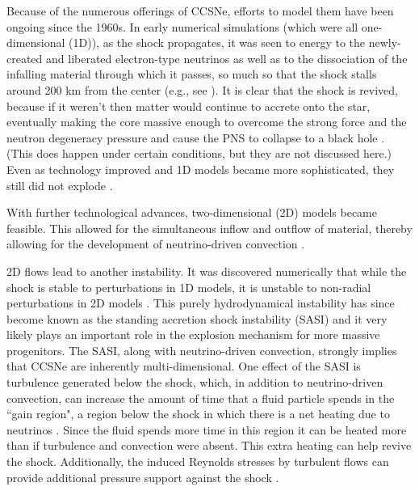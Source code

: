 Because of the numerous offerings of CCSNe, efforts to model them have been
ongoing since the 1960s.
In early numerical simulations (which were all one-dimensional (1D)),
as the shock propagates,
it was seen to energy to the newly-created and liberated
electron-type neutrinos as well as to the dissociation of the
infalling material through which it passes,
so much so that the shock stalls around 200 km from the center
(e.g., see \citet{hm1981}).
It is clear that the shock is revived, because if it weren't then matter
would continue to accrete onto the star, eventually making the core massive
enough to overcome the strong force and the neutron degeneracy pressure
and cause the PNS to collapse
to a black hole \citep{bw1985}.
(This does happen under certain conditions, but they are not discussed here.)
Even as technology improved and 1D
models became more sophisticated, they still did not explode
\citep[e.g., see][]{%
cj1960,
mw1966,
cw1966,
r1979,
hm1981,
bw1985,
mim1991,
mb1993,
mb1993a,
mb1993b,
rj2000,
mlm2001,
rj2002,
twi2003,
tbp2003,
lmm2004,
kjh2006,
sys2007,
zwh2008,
hmj2010,
thr2017,
sro2019,
bmo2021,
gmm2023%
}.

With further technological advances, two-dimensional (2D) models
became feasible.
This allowed for the simultaneous inflow and outflow of material,
thereby allowing for the development of neutrino-driven convection
\citep[e.g., see][]{%
hbc1992,
sys1993,
jm1995,
jm1995a,
mcb1998,
kpj2003,
kjh2006,
sjf2008,
fkh2011,
mm2011,
mjw2012,
tks2012,
mdb2013,
roa2016,
gmm2023%
}.

2D flows lead to another instability.
It was discovered numerically that while the shock is stable to
perturbations in 1D models, it is unstable to non-radial perturbations
in 2D models \citep{bmd2003}.
This purely hydrodynamical instability has since become known as the
standing accretion shock instability (SASI) and it very likely plays an
important role in the explosion mechanism for more massive progenitors.
The SASI, along with neutrino-driven convection, strongly implies that
CCSNe are inherently multi-dimensional.
One effect of the SASI is turbulence generated below the shock,
which, in addition to neutrino-driven convection,
can increase the amount of time that a fluid particle spends
in the ``gain region", a region below the shock in which there is a
net heating due to neutrinos \citep{co2015}.
Since the fluid spends more time in this region it can be heated more than if
turbulence and convection were absent.
This extra heating can help revive the shock.
Additionally, the induced Reynolds stresses by turbulent flows can provide additional
pressure support against the shock \citep[e.g., see][]{mm2018}.

